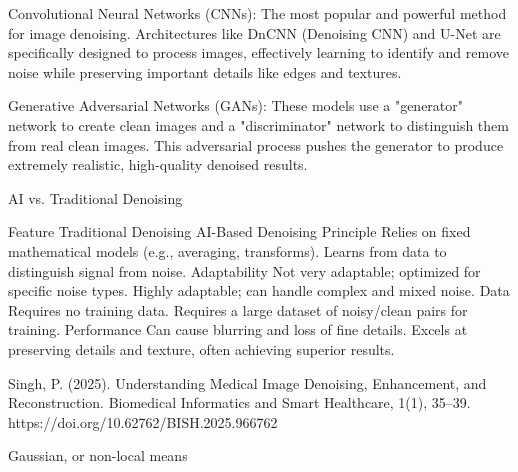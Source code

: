 Convolutional Neural Networks (CNNs): The most popular and powerful method for image denoising. Architectures like DnCNN (Denoising CNN) and U-Net are specifically designed to process images, effectively learning to identify and remove noise while preserving important details like edges and textures.

Generative Adversarial Networks (GANs): These models use a "generator" network to create clean images and a "discriminator" network to distinguish them from real clean images. This adversarial process pushes the generator to produce extremely realistic, high-quality denoised results.

AI vs. Traditional Denoising

Feature	Traditional Denoising	AI-Based Denoising
Principle	Relies on fixed mathematical models (e.g., averaging, transforms).	Learns from data to distinguish signal from noise.
Adaptability	Not very adaptable; optimized for specific noise types.	Highly adaptable; can handle complex and mixed noise.
Data	Requires no training data.	Requires a large dataset of noisy/clean pairs for training.
Performance	Can cause blurring and loss of fine details.	Excels at preserving details and texture, often achieving superior results.

Singh, P. (2025). Understanding Medical Image Denoising, Enhancement, and Reconstruction. Biomedical Informatics and Smart Healthcare, 1(1), 35–39. https://doi.org/10.62762/BISH.2025.966762

Gaussian,  or non-local means
